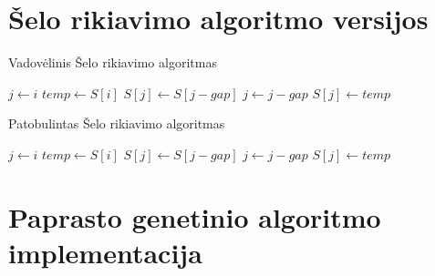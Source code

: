 \documentclass{VUMIFInfKursinis}
\begin{document}
\section{Šelo rikiavimo algoritmo versijos}

\begin{algorithm}[H]
  \caption{Vadovėlinis Šelo rikiavimo algoritmas}\label{alg:tss}
  \begin{algorithmic}[1]
      \State $j\gets i$
      \State $temp\gets S[i]$\label{alg:tss:assign1}
      \label{alg:tss:while:start}
        \State $S[j]\gets S[j - gap]$
        \State $j\gets j-gap$
      \EndWhile\label{alg:tss:while:end}
      \State $S[j]\gets temp$\label{alg:tss:assign2}
    \EndFor
  \EndFor
  \end{algorithmic}
\end{algorithm}

\begin{algorithm}[H]
  \caption{Patobulintas Šelo rikiavimo algoritmas}\label{alg:iss}
  \begin{algorithmic}[1]
        \State $j\gets i$
        \State $temp\gets S[i]$
        \Repeat
          \State $S[j]\gets S[j - gap]$
          \State $j\gets j-gap$
        \State $S[j]\gets temp$
      \EndIf
    \EndFor
  \EndFor
  \end{algorithmic}
\end{algorithm}

\section{Paprasto genetinio algoritmo implementacija}
\end{document}
